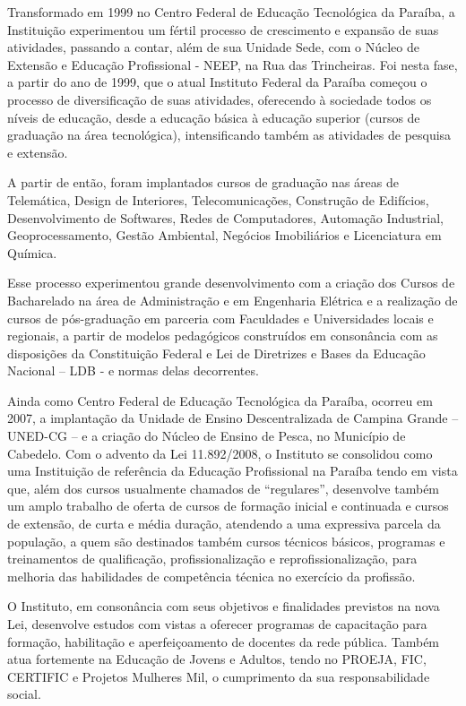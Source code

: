 	Transformado em 1999 no Centro Federal de Educação Tecnológica da Paraíba, a Instituição experimentou um fértil processo de crescimento e expansão de suas atividades, passando a contar, além de sua Unidade Sede, com o Núcleo de Extensão e Educação Profissional - NEEP, na Rua das Trincheiras. Foi nesta fase, a partir do ano de 1999, que o atual Instituto Federal da Paraíba começou o processo de diversificação de suas atividades, oferecendo à sociedade todos os níveis de educação, desde a educação básica à educação superior (cursos de graduação na área tecnológica), intensificando também as atividades de pesquisa e extensão. 
	
	A partir de então, foram implantados cursos de graduação nas áreas de Telemática, Design de Interiores, Telecomunicações, Construção de Edifícios, Desenvolvimento de Softwares, Redes de Computadores, Automação Industrial, Geoprocessamento, Gestão Ambiental, Negócios Imobiliários e Licenciatura em Química. 
	
	Esse processo experimentou grande desenvolvimento com a criação dos Cursos de Bacharelado na área de Administração e em Engenharia Elétrica e a realização de cursos de pós-graduação em parceria com Faculdades e Universidades locais e regionais, a partir de modelos pedagógicos construídos em consonância com as disposições da Constituição Federal e Lei de Diretrizes e Bases da Educação Nacional – LDB - e normas delas decorrentes.
	
	Ainda como Centro Federal de Educação Tecnológica da Paraíba, ocorreu em 2007, a implantação da Unidade de Ensino Descentralizada de Campina Grande – UNED-CG – e a criação do Núcleo de Ensino de Pesca, no Município de Cabedelo. Com o advento da Lei 11.892/2008, o Instituto se consolidou como uma Instituição de referência da Educação Profissional na Paraíba tendo em vista que, além dos cursos usualmente chamados de “regulares”, desenvolve também um amplo trabalho de oferta de cursos de formação inicial e continuada e cursos de extensão, de curta e média duração, atendendo a uma expressiva parcela da população, a quem são destinados também cursos técnicos básicos, programas e treinamentos de qualificação, profissionalização e reprofissionalização, para melhoria das habilidades de competência técnica no exercício da profissão.
	
	O Instituto, em consonância com seus objetivos e finalidades previstos na nova Lei, desenvolve estudos com vistas a oferecer programas de capacitação para formação, habilitação e aperfeiçoamento de docentes da rede pública. Também atua fortemente na Educação de Jovens e Adultos, tendo no PROEJA, FIC, CERTIFIC e Projetos Mulheres Mil, o cumprimento da sua responsabilidade social.
	
